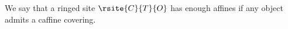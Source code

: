 \begin{definition}
We say that a ringed site $\rsite{C}{T}{O}$ has enough affines
if any object admits a caffine covering.
\end{definition}